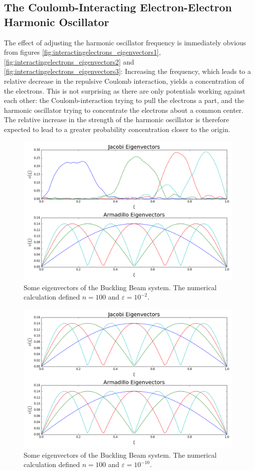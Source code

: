 \documentclass[reprint,english]{revtex4-1}
\begin{document}
\subsection{The Coulomb-Interacting Electron-Electron Harmonic Oscillator}
The effect of adjusting the harmonic oscillator frequency is immediately obvious from figures \ref{fig:interactingelectrons_eigenvectors1}, \ref{fig:interactingelectrons_eigenvectors2} and \ref{fig:interactingelectrons_eigenvectors3}: Increasing the frequency, which leads to a relative decrease in the repulsive Coulomb interaction, yields a concentration of the electrons. This is not surprising as there are only potentials working against each other: the Coulomb-interaction trying to pull the electrons a part, and the harmonic oscillator trying to concentrate the electrons about a common center. The relative increase in the strength of the harmonic oscillator is therefore expected to lead to a greater probability concentration closer to the origin.
\newpage
\begin{figure}[ht!]
\centering
\includegraphics[scale=0.27]{BucklingBeam/plots/vector100_2.png}
\caption{Some eigenvectors of the Buckling Beam system. The numerical calculation defined \(n=100\) and \(\varepsilon=10^{-2}\).}
\label{fig:bucklingbeam_eigenvectors1}
\end{figure}
\begin{figure}[ht!]
\centering
\includegraphics[scale=0.27]{BucklingBeam/plots/vector100_10.png}
\caption{Some eigenvectors of the Buckling Beam system. The numerical calculation defined \(n=100\) and \(\varepsilon=10^{-10}\).}
\label{fig:bucklingbeam_eigenvectors2}
\end{figure}
\end{document}
